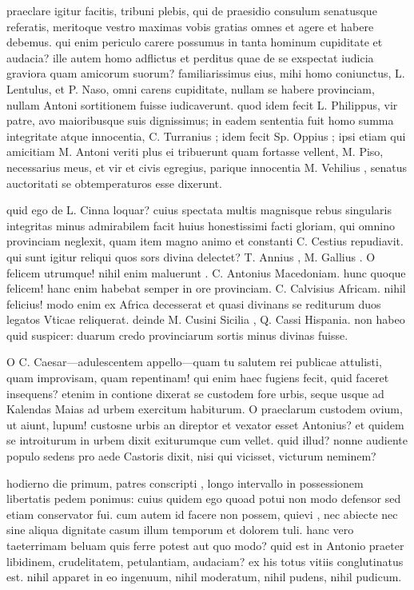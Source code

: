  praeclare igitur facitis, tribuni plebis, qui de praesidio consulum senatusque referatis, meritoque vestro maximas vobis gratias omnes et agere et habere debemus. qui enim periculo carere possumus in tanta hominum cupiditate et audacia? ille autem homo adflictus et perditus quae de se exspectat iudicia graviora quam amicorum suorum? familiarissimus eius, mihi homo coniunctus, L. Lentulus, et P. Naso, omni carens cupiditate, nullam se habere provinciam, nullam Antoni sortitionem fuisse iudicaverunt. quod idem fecit L. Philippus, vir patre, avo maioribusque suis dignissimus; in eadem sententia fuit homo summa integritate atque innocentia, C. Turranius ; idem fecit Sp. Oppius ; ipsi etiam qui amicitiam M. Antoni veriti plus ei tribuerunt quam fortasse vellent, M. Piso, necessarius meus, et vir et civis egregius, parique innocentia M. Vehilius , senatus auctoritati se obtemperaturos esse dixerunt.

 quid ego de L. Cinna loquar? cuius spectata multis magnisque rebus singularis integritas minus admirabilem facit huius honestissimi facti gloriam, qui omnino provinciam neglexit, quam item magno animo et constanti C. Cestius repudiavit. qui sunt igitur reliqui quos sors divina delectet? T. Annius , M. Gallius . O felicem utrumque! nihil enim maluerunt . C. Antonius Macedoniam. hunc quoque felicem! hanc enim habebat semper in ore provinciam. C. Calvisius Africam. nihil felicius! modo enim ex Africa decesserat et quasi divinans se rediturum duos legatos Vticae reliquerat. deinde M. Cusini Sicilia , Q. Cassi Hispania. non habeo quid suspicer: duarum credo provinciarum sortis minus divinas fuisse.

 O C. Caesar—adulescentem appello—quam tu salutem rei publicae attulisti, quam improvisam, quam repentinam! qui enim haec fugiens fecit, quid faceret insequens? etenim in contione dixerat se custodem fore urbis, seque usque ad Kalendas Maias ad urbem exercitum habiturum. O praeclarum custodem ovium, ut aiunt, lupum! custosne urbis an direptor et vexator esset Antonius? et quidem se introiturum in urbem dixit exiturumque cum vellet. quid illud? nonne audiente populo sedens pro aede Castoris dixit, nisi qui vicisset, victurum neminem?

 hodierno die primum, patres conscripti , longo intervallo in possessionem libertatis pedem ponimus: cuius quidem ego quoad potui non modo defensor sed etiam conservator fui. cum autem id facere non possem, quievi , nec abiecte nec sine aliqua dignitate casum illum temporum et dolorem tuli. hanc vero taeterrimam beluam quis ferre potest aut quo modo? quid est in Antonio praeter libidinem, crudelitatem, petulantiam, audaciam? ex his totus vitiis conglutinatus est. nihil apparet in eo ingenuum, nihil moderatum, nihil pudens, nihil pudicum.

